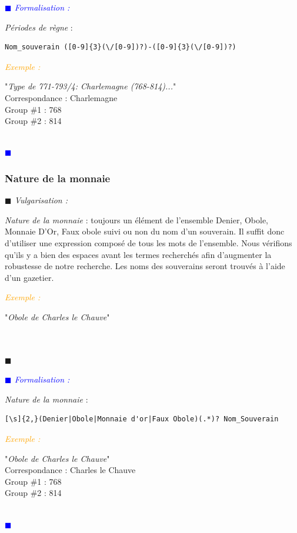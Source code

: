 \documentclass[a4paper, 11pt]{book}
\newenvironment{vulgarisation}
    {
    \textit{\textcolor{dark-blue}{$\blacksquare$  Vulgarisation : \\}}

    }
    {
    ~\\\textcolor{dark-blue}{$\blacksquare$}\\
    }
\newenvironment{formalisation}
    {
    \textit{\textcolor{blue}{$\blacksquare$  Formalisation : \\}}
    }
    {
    ~\\\textcolor{blue}{$\blacksquare$}\\
    }
\newenvironment{exemple}
    {
    \textit{\textcolor{orange}{
    Exemple : \\}}
    }
    {\\
    }
\begin{document}
\begin{formalisation}
	\textit{Périodes de règne} : 
	\begin{verbatim}
Nom_souverain ([0-9]{3}(\/[0-9])?)-([0-9]{3}(\/[0-9])?)
	\end{verbatim}
	\begin{exemple}
		"\emph{Type de 771-793/4: Charlemagne (768-814)...}" \\
		Correspondance : Charlemagne \\
		Group \#1 : 768 \\
		Group \#2 : 814
	\end{exemple}
\end{formalisation}

\subsubsection{Nature de la monnaie}
\begin{vulgarisation}
	\textit{Nature de la monnaie} : toujours un élément de l'ensemble {Denier, Obole, Monnaie D'Or, Faux obole} suivi ou non du nom d'un souverain. Il suffit donc d'utiliser une expression composé de tous les mots de l'ensemble. Nous vérifions qu'ils y a bien des espaces avant les termes recherchés afin d'augmenter la robustesse de notre recherche. Les noms des souverains seront trouvés à l'aide d'un gazetier.
	
	\begin{exemple}
		"\emph{Obole de Charles le Chauve}" \\
	\end{exemple}
\end{vulgarisation}

\begin{formalisation}
	\textit{Nature de la monnaie} :
	\begin{verbatim}
[\s]{2,}(Denier|Obole|Monnaie d'or|Faux Obole)(.*)? Nom_Souverain
	\end{verbatim}
	\begin{exemple}
		"\emph{Obole de Charles le Chauve}" \\
		Correspondance : Charles le Chauve \\
		Group \#1 : 768 \\
		Group \#2 : 814
	\end{exemple}
\end{formalisation}
\end{document}
